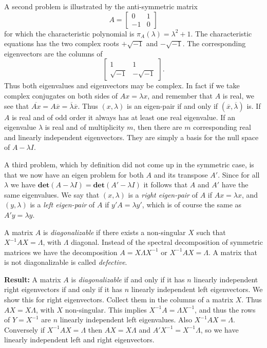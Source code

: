 \documentclass[
  12pt,
]{book}
\begin{document}
A second problem is illustrated by the anti-symmetric
matrix
\[
A=\begin{bmatrix}0&1\\-1&0\end{bmatrix}
\]
for which the characteristic polynomial
is \(\pi_A(\lambda)=\lambda^2+1\). The characteristic equations has the two complex roots \(+\sqrt{-1}\) and \(-\sqrt{-1}\). The corresponding eigenvectors are the columns of
\[
\begin{bmatrix}1&1\\\sqrt{-1}&-\sqrt{-1}\end{bmatrix}.
\]
Thus both eigenvalues and eigenvectors may be complex.
In fact if we take complex conjugates on both sides of \(Ax=\lambda x\), and remember that \(A\) is real, we see that \(\overline{Ax}=A\overline x=\overline{\lambda}\overline{x}.\)
Thus \((x,\lambda)\) is an eigen-pair if and only if \((\overline{x},\overline{\lambda})\) is. If \(A\) is real and of odd order it always has at least one real
eigenvalue. If an eigenvalue \(\lambda\) is real and of multiplicity \(m\), then there are \(m\) corresponding real and linearly independent eigenvectors. They are simply a basis for the null space of \(A-\lambda I\).

A third problem, which by definition did not come up in the symmetric case, is that we now have an eigen problem for both \(A\) and its transpose \(A'\).
Since for all \(\lambda\) we have \(\mathbf{det}(A-\lambda I)=\mathbf{det}(A'-\lambda I)\) it follows that \(A\) and \(A'\) have the same eigenvalues.
We say that \((x,\lambda)\) is a \emph{right eigen-pair} of \(A\) if \(Ax=\lambda x\), and \((y,\lambda)\) is a \emph{left eigen-pair} of \(A\) if \(y'A=\lambda y'\), which is of course the same as \(A'y=\lambda y\).

A matrix \(A\) is \emph{diagonalizable} if there exists a
non-singular \(X\) such that \(X^{-1}AX=\Lambda\), with \(\Lambda\) diagonal. Instead of the spectral decomposition of symmetric matrices we have the decomposition \(A=X\Lambda X^{-1}\)
or \(X^{-1}AX=\Lambda\). A matrix that is not diagonalizable is called \emph{defective}.

\textbf{Result:} A matrix \(A\) is \emph{diagonalizable} if and only if it has \(n\) linearly independent right eigenvectors if and only if it has \(n\) linearly independent left eigenvectors. We show this for right eigenvectors. Collect them in the columns of a matrix \(X\). Thus \(AX=X\Lambda\), with \(X\) non-singular. This implies \(X^{-1}A=\Lambda X^{-1}\), and thus the rows of \(Y=X^{-1}\)
are \(n\) linearly independent left eigenvalues.
Also \(X^{-1}AX=\Lambda\). Conversely if \(X^{-1}AX=\Lambda\)
then \(AX=X\Lambda\) and \(A'X^{-1}=X^{-1}\Lambda\), so we have
linearly independent left and right eigenvectors.
\end{document}
